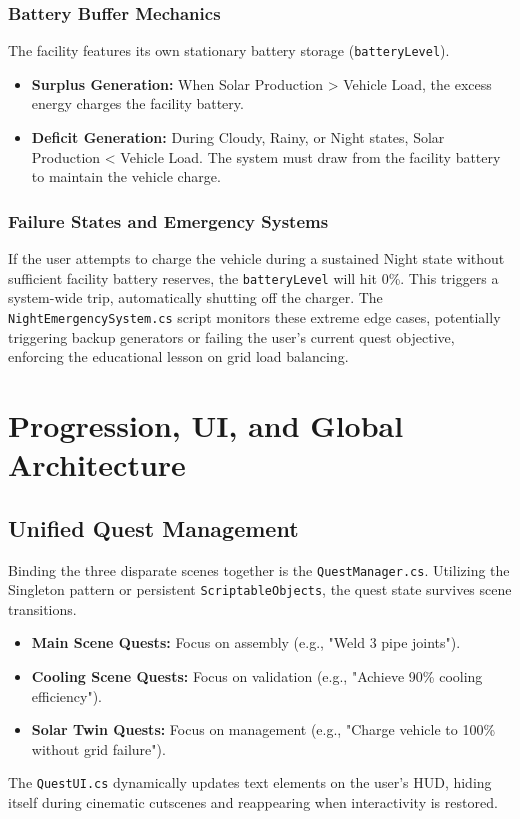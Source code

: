 \documentclass[12pt,a4paper,oneside]{report}
\begin{document}
\subsection{Battery Buffer Mechanics}
The facility features its own stationary battery storage (\texttt{batteryLevel}). 
\begin{itemize}
    \item \textbf{Surplus Generation:} When Solar Production > Vehicle Load, the excess energy charges the facility battery.
    \item \textbf{Deficit Generation:} During Cloudy, Rainy, or Night states, Solar Production < Vehicle Load. The system must draw from the facility battery to maintain the vehicle charge.
\end{itemize}

\subsection{Failure States and Emergency Systems}
If the user attempts to charge the vehicle during a sustained Night state without sufficient facility battery reserves, the \texttt{batteryLevel} will hit 0\%. This triggers a system-wide trip, automatically shutting off the charger. The \texttt{NightEmergencySystem.cs} script monitors these extreme edge cases, potentially triggering backup generators or failing the user's current quest objective, enforcing the educational lesson on grid load balancing.

\chapter{Progression, UI, and Global Architecture}

\section{Unified Quest Management}
Binding the three disparate scenes together is the \texttt{QuestManager.cs}. Utilizing the Singleton pattern or persistent \texttt{ScriptableObjects}, the quest state survives scene transitions.
\begin{itemize}
    \item \textbf{Main Scene Quests:} Focus on assembly (e.g., "Weld 3 pipe joints").
    \item \textbf{Cooling Scene Quests:} Focus on validation (e.g., "Achieve 90\% cooling efficiency").
    \item \textbf{Solar Twin Quests:} Focus on management (e.g., "Charge vehicle to 100\% without grid failure").
\end{itemize}
The \texttt{QuestUI.cs} dynamically updates text elements on the user's HUD, hiding itself during cinematic cutscenes and reappearing when interactivity is restored.
\end{document}
